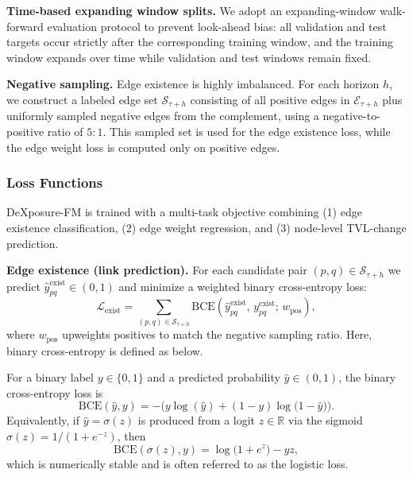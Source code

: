 \textbf{Time-based expanding window splits.}
We adopt an expanding-window walk-forward evaluation protocol to prevent look-ahead bias: all validation and test targets occur strictly after the corresponding training window, and the training window expands over time while validation and test windows remain fixed.

\textbf{Negative sampling.}
Edge existence is highly imbalanced.  For each horizon $h$, we construct a labeled edge set $\mathcal{S}_{\tau+h}$ consisting of all positive edges in $\mathcal{E}_{\tau+h}$ plus uniformly sampled negative edges from the complement, using a negative-to-positive ratio of $5{:}1$.
This sampled set is used for the edge existence loss, while the edge weight loss is computed only on positive edges.

\subsubsection{Loss Functions}\label{subsubsec:loss}
DeXposure-FM is trained with a multi-task objective combining (1) edge existence classification, (2) edge weight regression, and (3) node-level TVL-change prediction.

\textbf{Edge existence (link prediction).}
For each candidate pair $(p,q)\in\mathcal{S}_{\tau+h}$ we predict $\widehat{y}^{\text{exist}}_{pq}\in(0,1)$ and minimize a weighted binary cross-entropy loss:
\begin{equation}
\mathcal{L}_{\text{exist}}
=
\sum_{(p,q)\in\mathcal{S}_{\tau+h}}
\mathrm{BCE}\!\left(\widehat{y}^{\text{exist}}_{pq},\,y^{\text{exist}}_{pq};\,w_{\text{pos}}\right),
\label{eq:loss-exist}
\end{equation}
where $w_{\text{pos}}$ upweights positives to match the negative sampling ratio. Here, binary cross-entropy is defined as below. 

\begin{definition}
For a binary label $y\in\{0,1\}$ and a predicted probability $\hat{y}\in(0,1)$, the binary cross-entropy loss is
\begin{equation}
\mathrm{BCE}(\hat{y},y)
= -\Big(y\log(\hat{y}) + (1-y)\log\big(1-\hat{y}\big)\Big).
\label{eq:bce}
\end{equation}
Equivalently, if $\hat{y}=\sigma(z)$ is produced from a logit $z\in\mathbb{R}$ via the sigmoid $\sigma(z)=1/(1+e^{-z})$, then
\begin{equation}
\mathrm{BCE}(\sigma(z),y)
= \log\!\big(1+e^{z}\big) - yz,
\label{eq:bce-logit}
\end{equation}
which is numerically stable and is often referred to as the logistic loss.
\end{definition}

